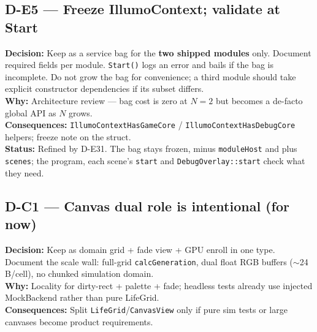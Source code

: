 \subsection*{D-E5 --- Freeze IllumoContext; validate at Start}
\begin{decisionbox}[title={D-E5 \quad 2026-07-28}]
\textbf{Decision:} Keep  as a service bag for the
\textbf{two shipped modules} only. Document required fields per module.
\texttt{Start()} logs an error and bails if the bag is incomplete.
Do not grow the bag for convenience; a third module should take explicit
constructor dependencies if its subset differs.\\
\textbf{Why:} Architecture review --- bag cost is zero at $N=2$ but becomes a
de-facto global API as $N$ grows.\\
\textbf{Consequences:} \texttt{IllumoContextHasGameCore} /
\texttt{IllumoContextHasDebugCore} helpers; freeze note on the struct.\\
\textbf{Status:} Refined by D-E31. The bag stays frozen, minus
\texttt{moduleHost} and plus \texttt{scenes}; the program, each scene's
\texttt{start} and \texttt{DebugOverlay::start} check what they need.
\end{decisionbox}

\subsection*{D-C1 --- Canvas dual role is intentional (for now)}
\begin{decisionbox}[title={D-C1 \quad 2026-07-28}]
\textbf{Decision:} Keep  as domain grid + fade view + GPU
enroll in one type. Document the scale wall: full-grid
\texttt{calcGeneration}, dual float RGB buffers ($\sim$24\,B/cell), no
chunked simulation domain.\\
\textbf{Why:} Locality for dirty-rect + palette + fade; headless tests already
use injected MockBackend rather than pure LifeGrid.\\
\textbf{Consequences:} Split \texttt{LifeGrid}/\texttt{CanvasView} only if pure
sim tests or large canvases become product requirements.
\end{decisionbox}

